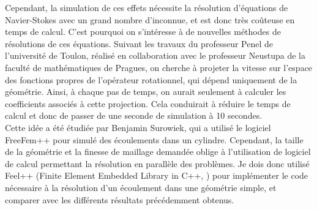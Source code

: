 Cependant, la simulation de ces effets nécessite la résolution d'équations de Navier-Stokes avec un grand nombre d'inconnue, et est donc très coûteuse en temps de calcul. C'est pourquoi on s'intéresse à de nouvelles méthodes de résolutions de ces équations. Suivant les travaux du professeur Penel de l'université de Toulon, réalisé en collaboration avec le professeur Neustupa de la faculté de mathématiques de Pragues, on cherche à projeter la vitesse sur l'espace des fonctions propres de l'opérateur rotationnel, qui dépend uniquement de la géométrie. Ainsi, à chaque pas de temps, on aurait seulement à calculer les coefficients associés à cette projection. Cela conduirait à réduire le temps de calcul et donc de passer de une seconde de simulation à 10 secondes.\\

Cette idée a été étudiée par Benjamin Surowiek, qui a utilisé le logiciel FreeFem++ pour simulé des écoulements dans un cylindre. Cependant, la taille de la géométrie et la finesse de maillage demandée oblige à l'utilisation de logiciel de calcul permettant la résolution en parallèle des problèmes. Je dois donc utilisé Feel++ (Finite Element Embedded Library in C++, \cite{PRUDHOMME:2012:HAL-00662868:3,feelpp098:10046} ) pour implémenter le code nécessaire à la résolution d'un écoulement dans une géométrie simple, et comparer avec les différents résultats précédemment obtenus.

